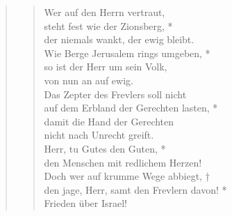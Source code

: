 \begin{quote}
\begin{verse}
\end{verse}

\begin{verse}


\smallskip

Wer auf den Herrn vertraut,\\
steht fest wie der Zionsberg, *\\
der niemals wankt, der ewig bleibt.\\
\vin Wie Berge Jerusalem rings umgeben, *\\
\vin so ist der Herr um sein Volk,\\
\vin von nun an auf ewig.\\
Das Zepter des Frevlers soll nicht\\
auf dem Erbland der Gerechten lasten, *\\
damit die Hand der Gerechten\\
nicht nach Unrecht greift.\\
\vin Herr, tu Gutes den Guten, *\\
\vin den Menschen mit redlichem Herzen!\\
Doch wer auf krumme Wege abbiegt, †\\
den jage, Herr, samt den Frevlern davon! *\\
Frieden über Israel!\\

\end{verse}
\end{quote}